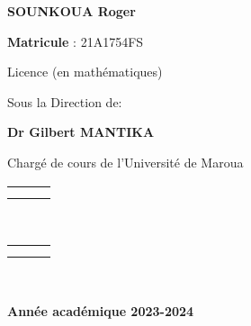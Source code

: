 \documentclass[a4paper, 14pt]{report}
\begin{document}
\begin{center}
{			\begin{center}
				\textbf{SOUNKOUA Roger}
			\end{center}
			
			\begin{center}
				\textbf{Matricule }: 21A1754FS
			\end{center}
			
			\begin{center}
				Licence (en mathématiques)
			\end{center}
			
			\begin{center}
				Sous la Direction de:
			\end{center}
			
			\begin{center}
				\textbf{ Dr Gilbert MANTIKA }
			\end{center}
			\begin{center}
				Chargé de cours de l'Université de Maroua
			\end{center}
			\begin{center}
				
				\begin{tabularx}{\textwidth}{>{\centering}XcX<{\centering}}
					
					& & \\
					& & \\
					
				\end{tabularx}\\
				
				
				\begin{tabularx}{\textwidth}{>{\centering}XcX<{\centering}}
					
					& & \\
					& & \\
				\end{tabularx}\
				
				\textbf{Année académique 2023-2024}
				
			\end{center} \thispagestyle{empty}
		}
		
		\normalsize
		
		
		
		
	\end{center} \thispagestyle{empty}
	
\end{document}
